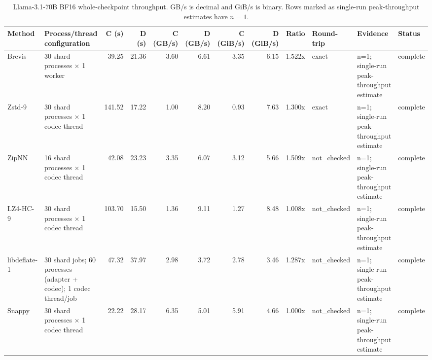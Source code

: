 \begin{table}[t]
\centering
\scriptsize
\begin{tabular}{llrrrrrrrlll}
\toprule
Method & Process/thread configuration & C (s) & D (s) & C (GB/s) & D (GB/s) & C (GiB/s) & D (GiB/s) & Ratio & Round-trip & Evidence & Status \\
\midrule
Brevis & 30 shard processes $\times$ 1 worker & 39.25 & 21.36 & 3.60 & 6.61 & 3.35 & 6.15 & 1.522x & exact & n=1; single-run peak-throughput estimate & complete \\
Zstd-9 & 30 shard processes $\times$ 1 codec thread & 141.52 & 17.22 & 1.00 & 8.20 & 0.93 & 7.63 & 1.300x & exact & n=1; single-run peak-throughput estimate & complete \\
ZipNN & 16 shard processes $\times$ 1 codec thread & 42.08 & 23.23 & 3.35 & 6.07 & 3.12 & 5.66 & 1.509x & not\_checked & n=1; single-run peak-throughput estimate & complete \\
LZ4-HC-9 & 30 shard processes $\times$ 1 codec thread & 103.70 & 15.50 & 1.36 & 9.11 & 1.27 & 8.48 & 1.008x & not\_checked & n=1; single-run peak-throughput estimate & complete \\
libdeflate-1 & 30 shard jobs; 60 processes (adapter + codec); 1 codec thread/job & 47.32 & 37.97 & 2.98 & 3.72 & 2.78 & 3.46 & 1.287x & not\_checked & n=1; single-run peak-throughput estimate & complete \\
Snappy & 30 shard processes $\times$ 1 codec thread & 22.22 & 28.17 & 6.35 & 5.01 & 5.91 & 4.66 & 1.000x & not\_checked & n=1; single-run peak-throughput estimate & complete \\
\bottomrule
\end{tabular}
\caption{Llama-3.1-70B BF16 whole-checkpoint throughput. GB/s is decimal and GiB/s is binary. Rows marked as single-run peak-throughput estimates have $n=1$.}
\label{tab:llama70-throughput}
\end{table}
